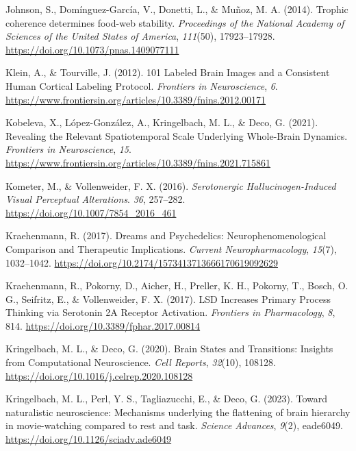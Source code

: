 \begin{CSLReferences}{1}{0}
Johnson, S., Domínguez-García, V., Donetti, L., \& Muñoz, M. A. (2014).
Trophic coherence determines food-web stability. \emph{Proceedings of
the National Academy of Sciences of the United States of America},
\emph{111}(50), 17923--17928.
\url{https://doi.org/10.1073/pnas.1409077111}

Klein, A., \& Tourville, J. (2012). 101 Labeled Brain Images and a
Consistent Human Cortical Labeling Protocol. \emph{Frontiers in
Neuroscience}, \emph{6}.
\url{https://www.frontiersin.org/articles/10.3389/fnins.2012.00171}

Kobeleva, X., López-González, A., Kringelbach, M. L., \& Deco, G.
(2021). Revealing the Relevant Spatiotemporal Scale Underlying
Whole-Brain Dynamics. \emph{Frontiers in Neuroscience}, \emph{15}.
\url{https://www.frontiersin.org/articles/10.3389/fnins.2021.715861}

Kometer, M., \& Vollenweider, F. X. (2016). \emph{Serotonergic
Hallucinogen-Induced Visual Perceptual Alterations}. \emph{36},
257--282. \url{https://doi.org/10.1007/7854_2016_461}

Kraehenmann, R. (2017). Dreams and Psychedelics: Neurophenomenological
Comparison and Therapeutic Implications. \emph{Current
Neuropharmacology}, \emph{15}(7), 1032--1042.
\url{https://doi.org/10.2174/1573413713666170619092629}

Kraehenmann, R., Pokorny, D., Aicher, H., Preller, K. H., Pokorny, T.,
Bosch, O. G., Seifritz, E., \& Vollenweider, F. X. (2017). LSD Increases
Primary Process Thinking via Serotonin 2A Receptor Activation.
\emph{Frontiers in Pharmacology}, \emph{8}, 814.
\url{https://doi.org/10.3389/fphar.2017.00814}

Kringelbach, M. L., \& Deco, G. (2020). Brain States and Transitions:
Insights from Computational Neuroscience. \emph{Cell Reports},
\emph{32}(10), 108128.
\url{https://doi.org/10.1016/j.celrep.2020.108128}

Kringelbach, M. L., Perl, Y. S., Tagliazucchi, E., \& Deco, G. (2023).
Toward naturalistic neuroscience: Mechanisms underlying the flattening
of brain hierarchy in movie-watching compared to rest and task.
\emph{Science Advances}, \emph{9}(2), eade6049.
\url{https://doi.org/10.1126/sciadv.ade6049}


\end{CSLReferences}
